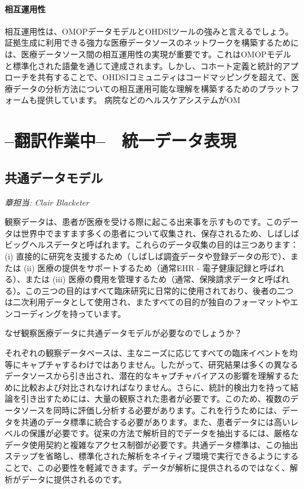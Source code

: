 \documentclass[
  11pt]{book}
\theoremstyle{definition}
\theoremstyle{definition}
\theoremstyle{definition}
\theoremstyle{definition}
\theoremstyle{remark}
\begin{document}
\subsection{相互運用性}\label{ux76f8ux4e92ux904bux7528ux6027}

相互運用性は、OMOPデータモデルとOHDSIツールの強みと言えるでしょう。証拠生成に利用できる強力な医療データソースのネットワークを構築するためには、医療データソース間の相互運用性の実現が重要です。これはOMOPモデルと標準化された語彙を通じて達成されます。しかし、コホート定義と統計的アプローチを共有することで、OHDSIコミュニティはコードマッピングを超えて、医療データの分析方法についての相互運用可能な理解を構築するためのプラットフォームも提供しています。
病院などのヘルスケアシステムがOM

\part{--翻訳作業中--　統一データ表現}\label{part-ux7ffbux8a33ux4f5cux696dux4e2d-ux7d71ux4e00ux30c7ux30fcux30bfux8868ux73fe}

\chapter{共通データモデル}\label{CommonDataModel}

\emph{章担当: Clair Blacketer}

観察データは、患者が医療を受ける際に起こる出来事を示すものです。このデータは世界中でますます多くの患者について収集され、保存されるため、しばしばビッグヘルスデータと呼ばれます。これらのデータ収集の目的は三つあります：(i) 直接的に研究を支援するため（しばしば調査データや登録データの形で）、または (ii) 医療の提供をサポートするため（通常EHR - 電子健康記録と呼ばれる）、または (iii) 医療の費用を管理するため（通常、保険請求データと呼ばれる）。この三つの目的はすべて臨床研究に日常的に使用されており、後者の二つは二次利用データとして使用され、またすべての目的が独自のフォーマットやエンコーディングを持っています。   

なぜ観察医療データに共通データモデルが必要なのでしょうか？

それぞれの観察データベースは、主なニーズに応じてすべての臨床イベントを均等にキャプチャするわけではありません。したがって、研究結果は多くの異なるデータソースから引き出され、潜在的なキャプチャバイアスの影響を理解するために比較および対比されなければなりません。さらに、統計的検出力を持って結論を引き出すためには、大量の観察された患者が必要です。このため、複数のデータソースを同時に評価し分析する必要があります。これを行うためには、データを共通のデータ標準に統合する必要があります。また、患者データには高いレベルの保護が必要です。従来の方法で解析目的でデータを抽出するには、厳格なデータ使用契約と複雑なアクセス制御が必要です。共通データ標準は、この抽出ステップを省略し、標準化された解析をネイティブ環境で実行できるようにすることで、この必要性を軽減できます。データが解析に提供されるのではなく、解析がデータに提供されるのです。
\end{document}
